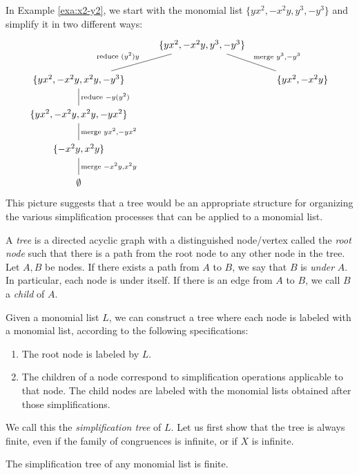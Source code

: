 In Example \ref{exa:x2-y2}, we start with the monomial list $\{yx^2, -x^2y, y^3, -y^3\}$ and simplify it in two different ways:
\[\begin{tikzcd}
& \{yx^2, -x^2y, y^3, -y^3\} \arrow[dl,swap,dash,"\text{reduce }(y^2)y"]\arrow[dr,dash,"\text{merge }y^3{,}-y^3"] \\
\{yx^2, -x^2y, x^2y, -y^3\} \arrow[d, dash, "\text{reduce }-y(y^2)"] && \{yx^2, -x^2y\}\\
\{yx^2, -x^2y, x^2y, -yx^2\} \arrow[d,dash,"\text{merge }yx^2{,}-yx^2"]\\
\{-x^2y, x^2y\} \arrow[d,dash,"\text{merge }-x^2y{,}x^2y"]\\
\emptyset
\end{tikzcd}\]
This picture suggests that a tree would be an appropriate structure for organizing the various simplification processes that can be applied to a monomial list.
\begin{defn}
	A \emph{tree} is a directed acyclic graph with a distinguished node/vertex called the \emph{root node} such that there is a path from the root node to any other node in the tree. Let $A,B$ be nodes. If there exists a path from $A$ to $B$, we say that $B$ is \emph{under} $A$. In particular, each node is under itself. If there is an edge from $A$ to $B$, we call $B$ a \emph{child} of $A$.
\end{defn}
Given a monomial list $L$, we can construct a tree where each node is labeled with a monomial list, according to the following specifications:
\begin{enumerate}
	\item The root node is labeled by $L$.
	\item The children of a node correspond to simplification operations applicable to that node. The child nodes are labeled with the monomial lists obtained after those simplifications.
\end{enumerate}
We call this the \emph{simplification tree} of $L$. Let us first show that the tree is always finite, even if the family of congruences is infinite, or if $X$ is infinite.
\begin{prop}\label{prop:finite-tree}
	The simplification tree of any monomial list is finite.
\end{prop}

